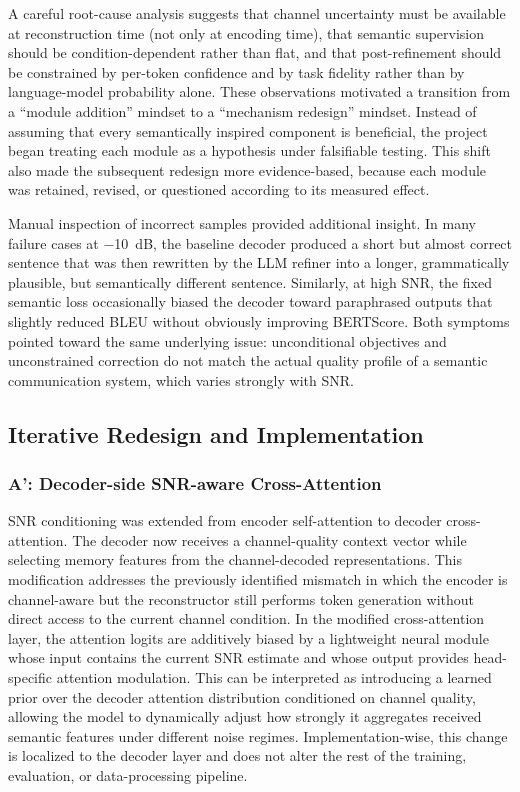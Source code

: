 A careful root-cause analysis suggests that channel uncertainty must be available at reconstruction time (not only at encoding time), that semantic supervision should be condition-dependent rather than flat, and that post-refinement should be constrained by per-token confidence and by task fidelity rather than by language-model probability alone. These observations motivated a transition from a “module addition” mindset to a “mechanism redesign” mindset. Instead of assuming that every semantically inspired component is beneficial, the project began treating each module as a hypothesis under falsifiable testing. This shift also made the subsequent redesign more evidence-based, because each module was retained, revised, or questioned according to its measured effect.

Manual inspection of incorrect samples provided additional insight. In many failure cases at \SI{-10}{dB}, the baseline decoder produced a short but almost correct sentence that was then rewritten by the LLM refiner into a longer, grammatically plausible, but semantically different sentence. Similarly, at high SNR, the fixed semantic loss occasionally biased the decoder toward paraphrased outputs that slightly reduced BLEU without obviously improving BERTScore. Both symptoms pointed toward the same underlying issue: unconditional objectives and unconstrained correction do not match the actual quality profile of a semantic communication system, which varies strongly with SNR.

\subsection{Iterative Redesign and Implementation}

\subsubsection{A': Decoder-side SNR-aware Cross-Attention}

SNR conditioning was extended from encoder self-attention to decoder cross-attention. The decoder now receives a channel-quality context vector while selecting memory features from the channel-decoded representations. This modification addresses the previously identified mismatch in which the encoder is channel-aware but the reconstructor still performs token generation without direct access to the current channel condition. In the modified cross-attention layer, the attention logits are additively biased by a lightweight neural module whose input contains the current SNR estimate and whose output provides head-specific attention modulation. This can be interpreted as introducing a learned prior over the decoder attention distribution conditioned on channel quality, allowing the model to dynamically adjust how strongly it aggregates received semantic features under different noise regimes. Implementation-wise, this change is localized to the decoder layer and does not alter the rest of the training, evaluation, or data-processing pipeline.


